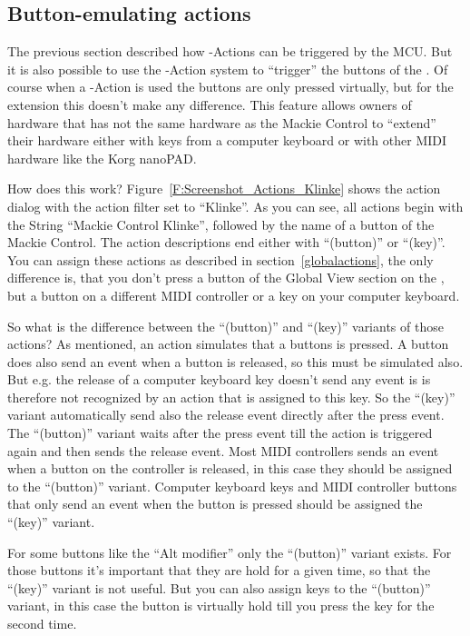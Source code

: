 \subsection{Button-emulating actions}\label{buttonactions}

The previous section described how \reaper-Actions can be triggered
by the MCU. But it is also possible to use the \reaper-Action
system to  ``trigger'' the buttons of the \mcu. Of course when a
\reaper-Action is used the buttons
are only pressed virtually, but for the \mcu extension this doesn't make
any difference. This feature allows owners of hardware that has not
the same hardware as the Mackie Control to ``extend'' their hardware either
with keys from a computer keyboard or with other MIDI hardware
like the Korg nanoPAD.


How does this work? Figure~\ref{F:Screenshot_Actions_Klinke} shows the
action dialog with the action filter set to ``Klinke''. As you can
see, all actions begin with the String ``Mackie Control Klinke'',
followed by the name of a button of the Mackie Control. The action
descriptions end either with ``(button)'' or ``(key)''. You can assign
these actions as described in section~\ref{globalactions}, the only
difference is, that you don't press a button of the Global View
section on the \mcu, but a button on a different MIDI controller or a
key on your computer keyboard.

So what is the difference between the ``(button)'' and ``(key)''
variants of those actions? As mentioned, an action simulates that
a \mcu buttons is pressed. A \mcu button does also send an event
when a button is released, so this must be simulated also. But
e.g. the release of a computer keyboard key doesn't send any event is
is therefore not recognized by an
action that is assigned to this key. So the ``(key)'' variant
automatically send also the release event directly after the press
event. The ``(button)'' variant waits after the press event till the
action is triggered again and then sends the release event. Most MIDI
controllers sends an event when a button on the controller is released,
in this case they should be assigned to the ``(button)''
variant. Computer keyboard keys and MIDI controller buttons that only send an
event when the button is pressed should be assigned the ``(key)'' variant.

For some buttons like the ``Alt modifier'' only the ``(button)''
variant exists. For those buttons it's important that they are hold
for a given time, so that the ``(key)'' variant is not useful. But you
can also assign keys to the ``(button)'' variant, in this case the
button is virtually hold till you press the key for the second time.


